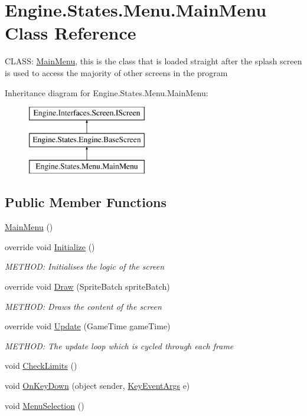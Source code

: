 \hypertarget{a00574}{}\section{Engine.\+States.\+Menu.\+Main\+Menu Class Reference}
\label{a00574}


C\+L\+A\+SS\+: \hyperlink{a00574}{Main\+Menu}, this is the class that is loaded straight after the splash screen is used to access the majority of other screens in the program  


Inheritance diagram for Engine.\+States.\+Menu.\+Main\+Menu\+:\begin{figure}[H]
\begin{center}
\leavevmode
\includegraphics[height=3.000000cm]{d4/dbe/a00574}
\end{center}
\end{figure}
\subsection*{Public Member Functions}
\begin{DoxyCompactItemize}
\item 
\hyperlink{a00574_a90df30106a466b9da59ebda89c6172db}{Main\+Menu} ()
\item 
override void \hyperlink{a00574_a43b83f0941e721234fdceeb0b5587f1b}{Initialize} ()
\begin{DoxyCompactList}\small\item\em M\+E\+T\+H\+OD\+: Initialises the logic of the screen \end{DoxyCompactList}\item 
override void \hyperlink{a00574_a193970cc59914f538ae0bcd39fe1ef48}{Draw} (Sprite\+Batch sprite\+Batch)
\begin{DoxyCompactList}\small\item\em M\+E\+T\+H\+OD\+: Draws the content of the screen \end{DoxyCompactList}\item 
override void \hyperlink{a00574_ad667a7ff9dea79bee26a4205418c7a61}{Update} (Game\+Time game\+Time)
\begin{DoxyCompactList}\small\item\em M\+E\+T\+H\+OD\+: The update loop which is cycled through each frame \end{DoxyCompactList}\item 
void \hyperlink{a00574_a18a59c1bc70e322805c36a3ca5c7d107}{Check\+Limits} ()
\item 
void \hyperlink{a00574_acb1e589815e4a3897d061d69a17dd7d9}{On\+Key\+Down} (object sender, \hyperlink{a00362}{Key\+Event\+Args} e)
\item 
void \hyperlink{a00574_a3f150b2f6278d7267d54b38601534ed1}{Menu\+Selection} ()
\end{DoxyCompactItemize}
